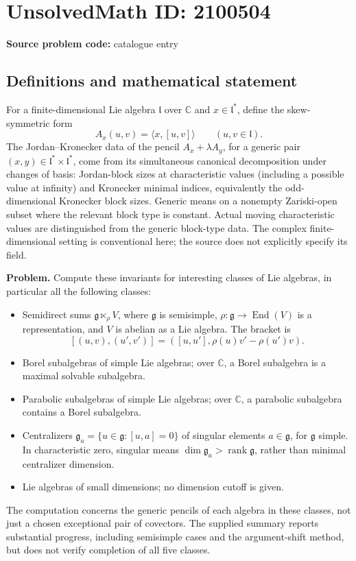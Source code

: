 \documentclass[11pt]{article}
\begin{document}
\section*{UnsolvedMath ID: 2100504}
\textbf{Source problem code:} catalogue entry
\subsection{Definitions and mathematical statement}
For a finite-dimensional Lie algebra $\mathfrak l$ over $\mathbb C$ and $x\in\mathfrak l^*$, define the skew-symmetric form
\[
A_x(u,v)=\langle x,[u,v]\rangle\qquad(u,v\in\mathfrak l).
\]
The Jordan--Kronecker data of the pencil $A_x+\lambda A_y$, for a generic pair $(x,y)\in\mathfrak l^*\times\mathfrak l^*$, come from its simultaneous canonical decomposition under changes of basis: Jordan-block sizes at characteristic values (including a possible value at infinity) and Kronecker minimal indices, equivalently the odd-dimensional Kronecker block sizes. Generic means on a nonempty Zariski-open subset where the relevant block type is constant. Actual moving characteristic values are distinguished from the generic block-type data. The complex finite-dimensional setting is conventional here; the source does not explicitly specify its field.

\textbf{Problem.} Compute these invariants for interesting classes of Lie algebras, in particular all the following classes:
\begin{itemize}
\item[(a)] Semidirect sums $\mathfrak g\ltimes_{\rho}V$, where $\mathfrak g$ is semisimple, $\rho:\mathfrak g\to\operatorname{End}(V)$ is a representation, and $V$ is abelian as a Lie algebra. The bracket is
\[
[(u,v),(u',v')]=([u,u'],\rho(u)v'-\rho(u')v).
\]
\item[(b)] Borel subalgebras of simple Lie algebras; over $\mathbb C$, a Borel subalgebra is a maximal solvable subalgebra.
\item[(c)] Parabolic subalgebras of simple Lie algebras; over $\mathbb C$, a parabolic subalgebra contains a Borel subalgebra.
\item[(d)] Centralizers $\mathfrak g_a=\{u\in\mathfrak g:[u,a]=0\}$ of singular elements $a\in\mathfrak g$, for $\mathfrak g$ simple. In characteristic zero, singular means $\dim\mathfrak g_a>\operatorname{rank}\mathfrak g$, rather than minimal centralizer dimension.
\item[(e)] Lie algebras of small dimensions; no dimension cutoff is given.
\end{itemize}
The computation concerns the generic pencils of each algebra in these classes, not just a chosen exceptional pair of covectors. The supplied summary reports substantial progress, including semisimple cases and the argument-shift method, but does not verify completion of all five classes.
\end{document}

